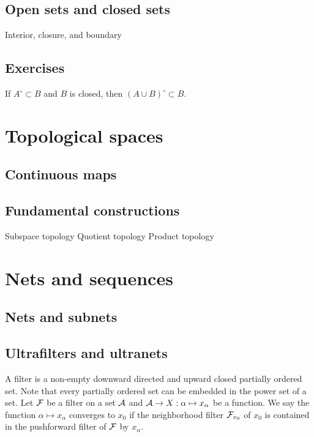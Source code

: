 \documentclass{../../large}
\begin{document}
\section{Open sets and closed sets}
Interior, closure, and boundary


\section*{Exercises}

\begin{prb}
If $A^\circ\subset B$ and $B$ is closed, then $(A\cup B)^\circ\subset B$.
\end{prb}




\chapter{Topological spaces}
\section{Continuous maps}

\section{Fundamental constructions}
Subspace topology
Quotient topology
Product topology




\chapter{Nets and sequences}
\section{Nets and subnets}


\section{Ultrafilters and ultranets}

A filter is a non-empty downward directed and upward closed partially ordered set.
Note that every partially ordered set can be embedded in the power set of a set.
Let $\mathcal{F}$ be a filter on a set $\mathcal{A}$ and $\mathcal{A}\to X:\alpha\mapsto x_\alpha$ be a function.
We say the function $\alpha\mapsto x_\alpha$ converges to $x_0$ if the neighborhood filter $\mathcal{F}_{x_0}$ of $x_0$ is contained in the pushforward filter of $\mathcal{F}$ by $x_\alpha$.
\end{document}
